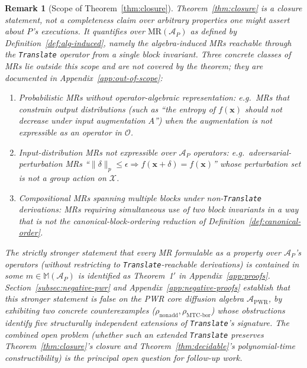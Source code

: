 \documentclass[manuscript]{acmart}
\newtheorem{remark}{Remark}
\begin{document}
\begin{remark}[Scope of Theorem~\ref{thm:closure}]
\label{rem:scope}
Theorem~\ref{thm:closure} is a closure statement, not a completeness claim over arbitrary properties one might assert about $P$'s executions. It quantifies over $\mathrm{MR}(\mathcal{A}_P)$ as defined by Definition~\ref{def:alg-induced}, namely the algebra-induced MRs reachable through the \texttt{Translate} operator from a single block invariant. Three concrete classes of MRs lie outside this scope and are not covered by the theorem; they are documented in Appendix~\ref{app:out-of-scope}:
\begin{enumerate}
    \item \emph{Probabilistic MRs without operator-algebraic representation}: e.g.\ MRs that constrain output \emph{distributions} (such as ``the entropy of $f(\mathbf{x})$ should not decrease under input augmentation $A$'') when the augmentation is not expressible as an operator in $\mathcal{O}$.
    \item \emph{Input-distribution MRs} not expressible over $\mathcal{A}_P$ operators: e.g.\ adversarial-perturbation MRs ``$\| \delta\|_p \le \epsilon \Rightarrow f(\mathbf{x}+\delta) = f(\mathbf{x})$'' whose perturbation set is not a group action on $\mathcal{X}$.
    \item \emph{Compositional MRs spanning multiple blocks under non-\texttt{Translate} derivations}: MRs requiring simultaneous use of two block invariants in a way that is not the canonical-block-ordering reduction of Definition~\ref{def:canonical-order}.
\end{enumerate}
The strictly stronger statement that every MR formulable as a property over $\mathcal{A}_P$'s operators (without restricting to \texttt{Translate}-reachable derivations) is contained in some $m \in \mathbb{M}(\mathcal{A}_P)$ is identified as Theorem~1$'$ in Appendix~\ref{app:proofs}. Section~\ref{subsec:negative-pwr} and Appendix~\ref{app:negative-proofs} establish that this stronger statement is false on the PWR core diffusion algebra $\mathcal{A}_{\mathrm{PWR}}$, by exhibiting two concrete counterexamples ($\rho_{\mathrm{nonadd}}, \rho_{\mathrm{MTC\text{-}bor}}$) whose obstructions identify five structurally independent extensions of \texttt{Translate}'s signature. The combined open problem (whether such an extended \texttt{Translate} preserves Theorem~\ref{thm:closure}'s closure and Theorem~\ref{thm:decidable}'s polynomial-time constructibility) is the principal open question for follow-up work.
\end{remark}
\end{document}
